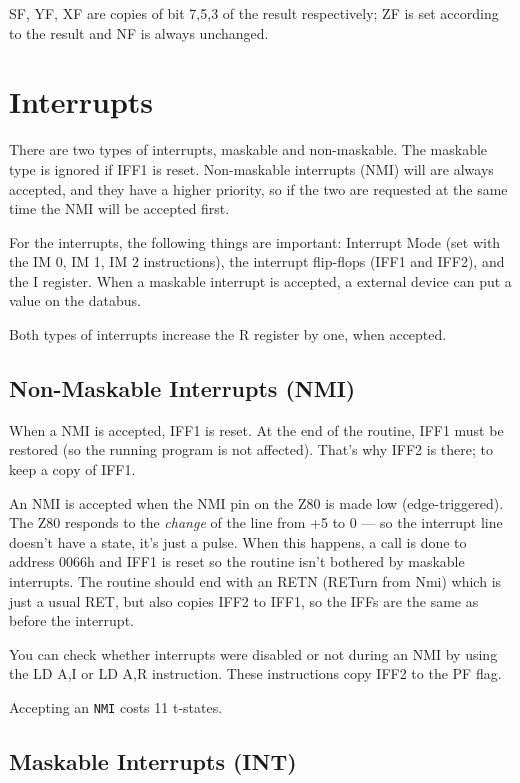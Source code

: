 \documentclass[oneside,a4paper]{book}
\begin{document}
SF, YF, XF are copies of bit 7,5,3 of the result respectively; ZF is set 
according to the result and NF is always unchanged.

\chapter{Interrupts}
\label{interrupts}

There are two types of interrupts, maskable and non-maskable. The maskable
type is ignored if IFF1 is reset. Non-maskable interrupts (NMI) will
are always accepted, and they have a higher priority, so if the two are 
requested at the same time the NMI will be accepted first.

For the interrupts, the following things are important: Interrupt Mode
(set with the {\ttfamily IM 0, IM 1, IM 2} instructions), the interrupt 
flip-flops (IFF1 and IFF2), and the I register. When a maskable interrupt
is accepted, a external device can put a value on the databus.

Both types of interrupts increase the R register by one, when accepted.

\section{Non-Maskable Interrupts (NMI)}

When a NMI is accepted, IFF1 is reset. At the end of the routine, IFF1 must
be restored (so the running program is not affected). That's why IFF2 is
there; to keep a copy of IFF1.

An NMI is accepted when the NMI pin on the Z80 is made low (edge-triggered). 
The Z80 responds to the {\em change} of the line from +5 to 0 --- so the 
interrupt line doesn't have a state, it's just a pulse. When this happens, 
a call is done to address 0066h and IFF1 is reset so the routine isn't 
bothered by maskable interrupts. The routine should end with an 
{\ttfamily RETN} (RETurn from Nmi) which is just a usual RET, but also 
copies IFF2 to IFF1, so the IFFs are the same as before the interrupt.

You can check whether interrupts were disabled or not during an NMI by using 
the {\ttfamily LD A,I} or {\ttfamily LD A,R} instruction. These instructions 
copy IFF2 to the PF flag.

Accepting an {\tt NMI} costs 11 t-states.

\section{Maskable Interrupts (INT)}
\end{document}
